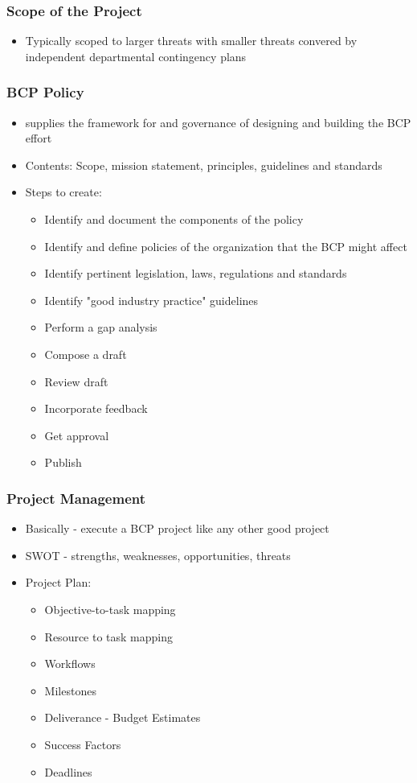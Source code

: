 \documentclass[11pt]{article}
\begin{document}
\subsubsection{Scope of the Project}
\label{sec:org9168802}
\begin{itemize}
\item Typically scoped to larger threats with smaller threats convered by independent departmental contingency plans
\end{itemize}
\subsubsection{BCP Policy}
\label{sec:org9271dbe}
\begin{itemize}
\item supplies the framework for and governance of designing and building the BCP effort
\item Contents: Scope, mission statement, principles, guidelines and standards
\item Steps to create:
\begin{itemize}
\item Identify and document the components of the policy
\item Identify and define policies of the organization that the BCP might affect
\item Identify pertinent legislation, laws, regulations and standards
\item Identify "good industry practice" guidelines
\item Perform a gap analysis
\item Compose a draft
\item Review draft
\item Incorporate feedback
\item Get approval
\item Publish
\end{itemize}
\end{itemize}
\subsubsection{Project Management}
\label{sec:org0833e8a}
\begin{itemize}
\item Basically - execute a BCP project like any other good project
\item SWOT - strengths, weaknesses, opportunities, threats
\item Project Plan:
\begin{itemize}
\item Objective-to-task mapping
\item Resource to task mapping
\item Workflows
\item Milestones
\item Deliverance  - Budget Estimates
\item Success Factors
\item Deadlines
\end{itemize}
\end{itemize}
\end{document}

